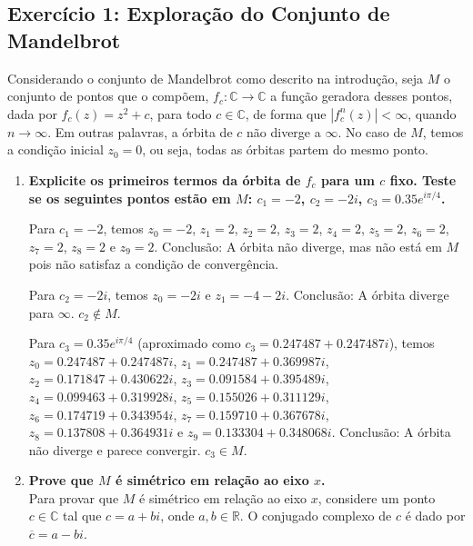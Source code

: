 \subsection*{Exercício 1: Exploração do Conjunto de Mandelbrot}

Considerando o conjunto de Mandelbrot como descrito na introdução, seja \( M \) o
conjunto de pontos que o compõem, \( f_c : \mathbb{C} \to \mathbb{C} \) a função geradora desses pontos, dada por \( f_c (z) = z^2 + c \), para todo
\( c \in \mathbb{C} \), de forma que \( |f_c^n (z)| < \infty \), quando \( n \to \infty \). Em outras palavras, a órbita de \( c \) não diverge a \( \infty \). No caso de
\( M \), temos a condição inicial \( z_0 = 0 \), ou seja, todas as órbitas partem do mesmo ponto.

\begin{enumerate}[label=(\alph*)]
    \item \textbf{Explicite os primeiros termos da órbita de \( f_c \) para um \( c \) fixo. Teste se os seguintes pontos estão em \( M \): \( c_1 = -2 \), \( c_2 = -2i \), \( c_3 = 0.35 e^{i\pi/4} \).}
    
        Para \( c_1 = -2 \), temos \( z_0 = -2 \), \( z_1 = 2 \), \( z_2 = 2 \), \( z_3 = 2 \), \( z_4 = 2 \), \( z_5 = 2 \), \( z_6 = 2 \), \( z_7 = 2 \), \( z_8 = 2 \) e \( z_9 = 2 \). Conclusão: A órbita não diverge, mas não está em \( M \) pois não satisfaz a condição de convergência.

        Para \( c_2 = -2i \), temos \( z_0 = -2i \) e \( z_1 = -4 - 2i \). Conclusão: A órbita diverge para \( \infty \). \( c_2 \notin M \).

        Para \( c_3 = 0.35 e^{i\pi/4} \) (aproximado como \( c_3 = 0.247487 + 0.247487i \)), temos \( z_0 = 0.247487 + 0.247487i \), \( z_1 = 0.247487 + 0.369987i \), \( z_2 = 0.171847 + 0.430622i \), \( z_3 = 0.091584 + 0.395489i \), \( z_4 = 0.099463 + 0.319928i \), \( z_5 = 0.155026 + 0.311129i \), \( z_6 = 0.174719 + 0.343954i \), \( z_7 = 0.159710 + 0.367678i \), \( z_8 = 0.137808 + 0.364931i \) e \( z_9 = 0.133304 + 0.348068i \). Conclusão: A órbita não diverge e parece convergir. \( c_3 \in M \).

    

    \item \textbf{Prove que \( M \) é simétrico em relação ao eixo \( x \).} \\

        Para provar que \( M \) é simétrico em relação ao eixo \( x \), considere um ponto \( c \in \mathbb{C} \) tal que \( c = a + bi \), onde \( a, b \in \mathbb{R} \). O conjugado complexo de \( c \) é dado por \( \overline{c} = a - bi \).


\end{enumerate}
